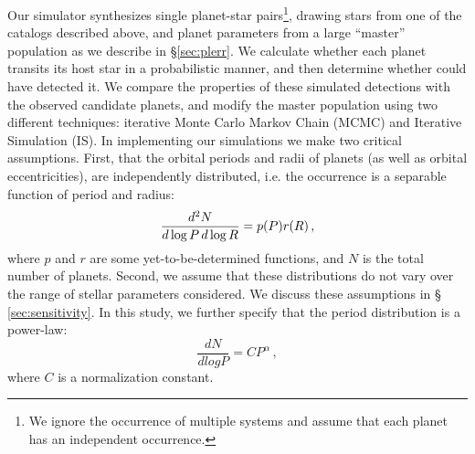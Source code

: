 Our simulator synthesizes single planet-star pairs\footnote{ We
  ignore the occurrence of multiple systems and assume that each
  planet has an independent occurrence.},  drawing stars from one of
the catalogs described above, and planet parameters from a large
``master'' population as we describe in \S \ref{sec:plerr}.  We calculate whether each
planet transits its host star in a probabilistic manner, and then determine
whether \kep{} could have detected it.  We compare the
properties of these simulated detections with the observed candidate \kep{}
planets, and modify the master population using two different
techniques: iterative Monte Carlo Markov Chain (MCMC) and Iterative Simulation
(IS).  In implementing our simulations we make two critical
assumptions. First, that the orbital periods and radii of \kep{}
planets (as well as orbital eccentricities), are independently
distributed, i.e. the occurrence is a separable function of period and
radius:
\begin{equation}
{{d^2 N}\over{{d\log P \, d\log R}}} = p(P) r(R)\, ,
\label{eq:assumption}
\end{equation}
where $p$ and $r$ are some yet-to-be-determined functions, and  
$N$ is the total number of planets. 
Second, we assume that these distributions do not vary over the range
of stellar parameters considered.  We discuss these assumptions in \S
\ref{sec:sensitivity}.  In this study, we further specify that the
  period distribution is a power-law:
\begin{equation}
\frac{dN}{d log P} = C P^{\alpha}\, ,
\label{eq:P}
\end{equation}
where $C$ is a normalization constant.


